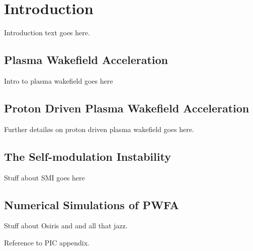 %
%

\chapter{Introduction}
\label{Ch:Intro}

Introduction text goes here.

\section{Plasma Wakefield Acceleration}
\label{Int:PWFA}

Intro to plasma wakefield goes here

\section{Proton Driven Plasma Wakefield Acceleration}
\label{Int:PDPWFA}

Further detailøs on proton driven plasma wakefield goes here.

\section{The Self-modulation Instability}
\label{Int:SMI}

Stuff about SMI goes here

\section{Numerical Simulations of PWFA}
\label{Int:Sim}

Stuff about Osiris and and all that jazz.

Reference to PIC appendix.

